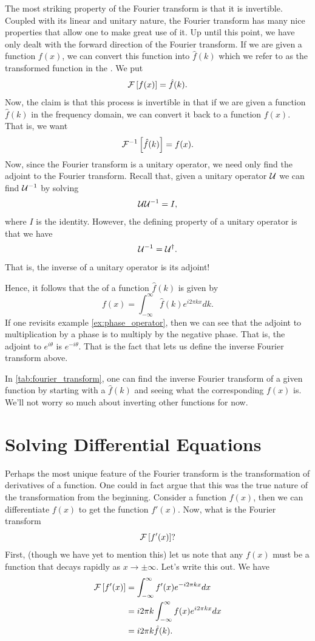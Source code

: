 The most striking property of the Fourier transform is that it is invertible. Coupled with its linear and unitary nature, the Fourier transform has many nice properties that allow one to make great use of it.  Up until this point, we have only dealt with the forward direction of the Fourier transform. If we are given a function $f(x)$, we can convert this function into $\hat{f}(k)$ which we refer to as the transformed function in the .  We put
\[
\mathcal{F}\left[ f(x) \right]=\hat{f}(k).
\]
Now, the claim is that this process is invertible in that if we are given a function $\hat{f}(k)$ in the frequency domain, we can convert it back to a function $f(x)$.  That is, we want 
\[
\mathcal{F}^{-1}\left[ \hat{f}(k) \right] = f(x).
\]
Now, since the Fourier transform is a unitary operator, we need only find the adjoint to the Fourier transform.  Recall that, given a unitary operator $\mathcal{U}$ we can find $\mathcal{U}^{-1}$ by solving
\[
\mathcal{U} \mathcal{U}^{-1} = I,
\]
where $I$ is the identity. However, the defining property of a unitary operator is that we have
\[
\mathcal{U}^{-1} = \mathcal{U}^\dagger.
\]
That is, the inverse of a unitary operator is its adjoint! 

Hence, it follows that the  of a function $\hat{f}(k)$ is given by
\[
f(x) = \int_{-\infty}^\infty \hat{f}(k) e^{i2\pi kx}dk.
\]
If one revisits example \ref{ex:phase_operator}, then we can see that the adjoint to multiplication by a phase is to multiply by the negative phase. That is, the adjoint to $e^{i\theta}$ is $e^{-i\theta}$.  That is the fact that lets us define the inverse Fourier transform above. 

In \ref{tab:fourier_transform}, one can find the inverse Fourier transform of a given function by starting with a $\hat{f}(k)$ and seeing what the corresponding $f(x)$ is.  We'll not worry so much about inverting other functions for now.  

\section{Solving Differential Equations}

Perhaps the most unique feature of the Fourier transform is the transformation of derivatives of a function.  One could in fact argue that this was the true nature of the transformation from the beginning.  Consider a function $f(x)$, then we can differentiate $f(x)$ to get the function $f'(x)$. Now, what is the Fourier transform
\[
\mathcal{F}\left[ f'(x) \right]?
\]
First, (though we have yet to mention this) let us note that any $f(x)$ must be a function that decays rapidly as $x\to \pm \infty$. Let's write this out. We have
\begin{align*}
	\mathcal{F}\left[ f'(x) \right] &= \int_{-\infty}^\infty f'(x)e^{-i2\pi kx}dx\\
	&= i2\pi k \int_{-\infty}^\infty f(x) e^{i2\pi kx}dx\\
	&= i2\pi k \hat{f}(k).
\end{align*}

